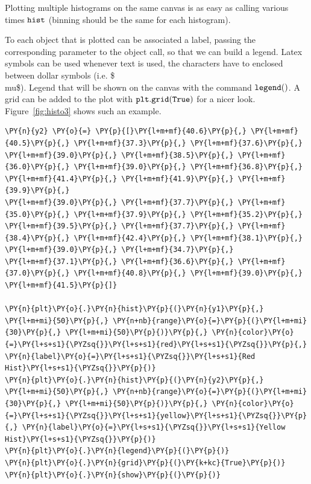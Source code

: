 Plotting multiple histograms on the same canvas is as easy as calling
various times \(\tt{hist}\) (binning should be the same for each
histogram).

To each object that is plotted can be associated a label, passing the
corresponding parameter to the object call, so that we can build a
legend. Latex symbols can be used whenever text is used, the characters
have to enclosed between dollar symbols (i.e. \$\\mu\$). Legend that
will be shown on the canvas with the command \(\tt{legend()}\).
A grid can be added to the plot with \(\tt{plt.grid(True)}\) for a nicer
look. Figure~\ref{fig:histo3} shows such an example.

\begin{tcolorbox}[breakable, size=fbox, boxrule=1pt, pad at break*=1mm,colback=cellbackground, colframe=cellborder]
\begin{Verbatim}[commandchars=\\\{\}]
\PY{n}{y2} \PY{o}{=} \PY{p}{[}\PY{l+m+mf}{40.6}\PY{p}{,} \PY{l+m+mf}{40.5}\PY{p}{,} \PY{l+m+mf}{37.3}\PY{p}{,} \PY{l+m+mf}{37.6}\PY{p}{,} \PY{l+m+mf}{39.0}\PY{p}{,} \PY{l+m+mf}{38.5}\PY{p}{,} \PY{l+m+mf}{36.0}\PY{p}{,} \PY{l+m+mf}{39.0}\PY{p}{,} \PY{l+m+mf}{36.8}\PY{p}{,} \PY{l+m+mf}{41.4}\PY{p}{,} \PY{l+m+mf}{41.9}\PY{p}{,} \PY{l+m+mf}{39.9}\PY{p}{,} 
\PY{l+m+mf}{39.0}\PY{p}{,} \PY{l+m+mf}{37.7}\PY{p}{,} \PY{l+m+mf}{35.0}\PY{p}{,} \PY{l+m+mf}{37.9}\PY{p}{,} \PY{l+m+mf}{35.2}\PY{p}{,} \PY{l+m+mf}{39.5}\PY{p}{,} \PY{l+m+mf}{37.7}\PY{p}{,} \PY{l+m+mf}{38.4}\PY{p}{,} \PY{l+m+mf}{42.4}\PY{p}{,} \PY{l+m+mf}{38.1}\PY{p}{,} \PY{l+m+mf}{39.0}\PY{p}{,} \PY{l+m+mf}{34.7}\PY{p}{,} 
\PY{l+m+mf}{37.1}\PY{p}{,} \PY{l+m+mf}{36.6}\PY{p}{,} \PY{l+m+mf}{37.0}\PY{p}{,} \PY{l+m+mf}{40.8}\PY{p}{,} \PY{l+m+mf}{39.0}\PY{p}{,} \PY{l+m+mf}{41.5}\PY{p}{]}
	
\PY{n}{plt}\PY{o}{.}\PY{n}{hist}\PY{p}{(}\PY{n}{y1}\PY{p}{,} \PY{l+m+mi}{50}\PY{p}{,} \PY{n+nb}{range}\PY{o}{=}\PY{p}{(}\PY{l+m+mi}{30}\PY{p}{,} \PY{l+m+mi}{50}\PY{p}{)}\PY{p}{,} \PY{n}{color}\PY{o}{=}\PY{l+s+s1}{\PYZsq{}}\PY{l+s+s1}{red}\PY{l+s+s1}{\PYZsq{}}\PY{p}{,} \PY{n}{label}\PY{o}{=}\PY{l+s+s1}{\PYZsq{}}\PY{l+s+s1}{Red Hist}\PY{l+s+s1}{\PYZsq{}}\PY{p}{)}
\PY{n}{plt}\PY{o}{.}\PY{n}{hist}\PY{p}{(}\PY{n}{y2}\PY{p}{,} \PY{l+m+mi}{50}\PY{p}{,} \PY{n+nb}{range}\PY{o}{=}\PY{p}{(}\PY{l+m+mi}{30}\PY{p}{,} \PY{l+m+mi}{50}\PY{p}{)}\PY{p}{,} \PY{n}{color}\PY{o}{=}\PY{l+s+s1}{\PYZsq{}}\PY{l+s+s1}{yellow}\PY{l+s+s1}{\PYZsq{}}\PY{p}{,} \PY{n}{label}\PY{o}{=}\PY{l+s+s1}{\PYZsq{}}\PY{l+s+s1}{Yellow Hist}\PY{l+s+s1}{\PYZsq{}}\PY{p}{)}
\PY{n}{plt}\PY{o}{.}\PY{n}{legend}\PY{p}{(}\PY{p}{)}
\PY{n}{plt}\PY{o}{.}\PY{n}{grid}\PY{p}{(}\PY{k+kc}{True}\PY{p}{)}
\PY{n}{plt}\PY{o}{.}\PY{n}{show}\PY{p}{(}\PY{p}{)}
\end{Verbatim}
\end{tcolorbox}

